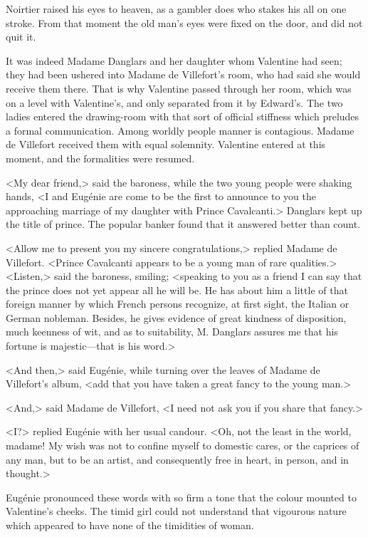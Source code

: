  Noirtier raised his eyes to heaven, as a gambler does who stakes his all on one stroke. From that moment the old man's eyes were fixed on the door, and did not quit it. 

 It was indeed Madame Danglars and her daughter whom Valentine had seen; they had been ushered into Madame de Villefort's room, who had said she would receive them there. That is why Valentine passed through her room, which was on a level with Valentine's, and only separated from it by Edward's. The two ladies entered the drawing-room with that sort of official stiffness which preludes a formal communication. Among worldly people manner is contagious. Madame de Villefort received them with equal solemnity. Valentine entered at this moment, and the formalities were resumed. 

 <My dear friend,> said the baroness, while the two young people were shaking hands, <I and Eugénie are come to be the first to announce to you the approaching marriage of my daughter with Prince Cavalcanti.> Danglars kept up the title of prince. The popular banker found that it answered better than count. 

 <Allow me to present you my sincere congratulations,> replied Madame de Villefort. <Prince Cavalcanti appears to be a young man of rare qualities.>  <Listen,> said the baroness, smiling; <speaking to you as a friend I can say that the prince does not yet appear all he will be. He has about him a little of that foreign manner by which French persons recognize, at first sight, the Italian or German nobleman. Besides, he gives evidence of great kindness of disposition, much keenness of wit, and as to suitability, M. Danglars assures me that his fortune is majestic—that is his word.> 

 <And then,> said Eugénie, while turning over the leaves of Madame de Villefort's album, <add that you have taken a great fancy to the young man.> 

 <And,> said Madame de Villefort, <I need not ask you if you share that fancy.> 

 <I?> replied Eugénie with her usual candour. <Oh, not the least in the world, madame! My wish was not to confine myself to domestic cares, or the caprices of any man, but to be an artist, and consequently free in heart, in person, and in thought.> 

 Eugénie pronounced these words with so firm a tone that the colour mounted to Valentine's cheeks. The timid girl could not understand that vigourous nature which appeared to have none of the timidities of woman. 

